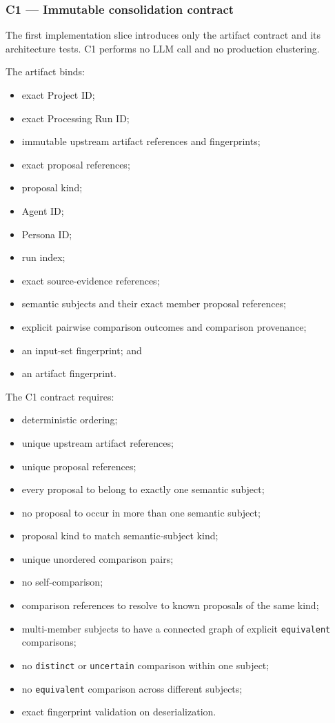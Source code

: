\hypertarget{c1--immutable-consolidation-contract}{%
\subsubsection{C1 --- Immutable consolidation contract}\label{c1--immutable-consolidation-contract}}

The first implementation slice introduces only the artifact contract and its architecture tests. C1 performs no LLM call and no production clustering.

The artifact binds:

\begin{itemize}
\tightlist
\item
  exact Project ID;
\item
  exact Processing Run ID;
\item
  immutable upstream artifact references and fingerprints;
\item
  exact proposal references;
\item
  proposal kind;
\item
  Agent ID;
\item
  Persona ID;
\item
  run index;
\item
  exact source-evidence references;
\item
  semantic subjects and their exact member proposal references;
\item
  explicit pairwise comparison outcomes and comparison provenance;
\item
  an input-set fingerprint; and
\item
  an artifact fingerprint.
\end{itemize}

The C1 contract requires:

\begin{itemize}
\tightlist
\item
  deterministic ordering;
\item
  unique upstream artifact references;
\item
  unique proposal references;
\item
  every proposal to belong to exactly one semantic subject;
\item
  no proposal to occur in more than one semantic subject;
\item
  proposal kind to match semantic-subject kind;
\item
  unique unordered comparison pairs;
\item
  no self-comparison;
\item
  comparison references to resolve to known proposals of the same kind;
\item
  multi-member subjects to have a connected graph of explicit \texttt{equivalent} comparisons;
\item
  no \texttt{distinct} or \texttt{uncertain} comparison within one subject;
\item
  no \texttt{equivalent} comparison across different subjects;
\item
  exact fingerprint validation on deserialization.
\end{itemize}

